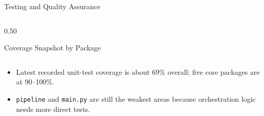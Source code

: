 \documentclass[
        11pt,
        compress,
        xcolor={dvipsnames}
    ]{beamer}
\begin{document}
\begin{frame}{Testing and Quality Assurance}
\begin{columns}[T]
\begin{column}{0.50\textwidth}
\begin{block}{Coverage Snapshot by Package}
\begin{tabular}{lr}
        \end{tabular}
      \end{block}
      \vspace{0.3em}
      \scriptsize
      \begin{itemize}\setlength{\itemsep}{0.3em}
        \item Latest recorded unit-test coverage is about 69\% overall; five core packages are at 90--100\%.
        \item \texttt{pipeline} and \texttt{main.py} are still the weakest areas because orchestration logic needs more direct tests.
      \end{itemize}
    \end{column}
  \end{columns}
\end{frame}
\end{document}
